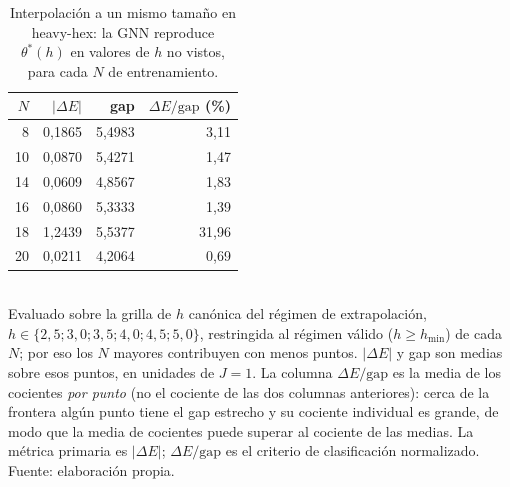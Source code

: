 \begin{table}[htbp]
\centering
\caption[Interpolación a un mismo tamaño (heavy-hex)]{Interpolación a un mismo tamaño en heavy-hex: la GNN reproduce $\theta^*(h)$ en valores de $h$ no vistos, para cada $N$ de entrenamiento.}
\label{tab:auto_heavy_hex_intra_n}
\begin{tabular}{rrrr}
\toprule
$N$ & $|\Delta E|$ & gap & $\Delta E/\mathrm{gap}$ (\%) \\
\midrule
8 & 0,1865 & 5,4983 & 3,11 \\
10 & 0,0870 & 5,4271 & 1,47 \\
14 & 0,0609 & 4,8567 & 1,83 \\
16 & 0,0860 & 5,3333 & 1,39 \\
18 & 1,2439 & 5,5377 & 31,96 \\
20 & 0,0211 & 4,2064 & 0,69 \\
\bottomrule
\end{tabular}
\\[2pt]
\footnotesize Evaluado sobre la grilla de $h$ canónica del régimen de extrapolación, $h \in \{2,5; 3,0; 3,5; 4,0; 4,5; 5,0\}$, restringida al régimen válido ($h \geq h_{\min}$) de cada $N$; por eso los $N$ mayores contribuyen con menos puntos. $|\Delta E|$ y gap son medias sobre esos puntos, en unidades de $J = 1$. La columna $\Delta E/\mathrm{gap}$ es la media de los cocientes \emph{por punto} (no el cociente de las dos columnas anteriores): cerca de la frontera algún punto tiene el gap estrecho y su cociente individual es grande, de modo que la media de cocientes puede superar al cociente de las medias. La métrica primaria es $|\Delta E|$; $\Delta E/\mathrm{gap}$ es el criterio de clasificación normalizado. Fuente: elaboración propia.
\end{table}
